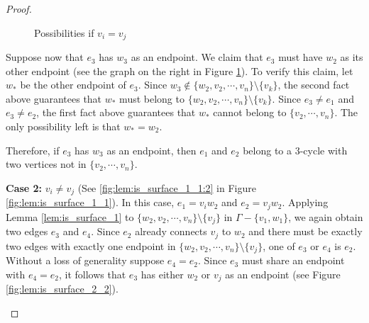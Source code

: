 \begin{proof}
\begin{figure}[h!]
        \quad\quad
        \caption{Possibilities if \(v_i = v_j\)}
        \label{fig:lem:is_surface_2_1}
    \end{figure}

    Suppose now that \(e_3\) has \(w_3\) as an endpoint.
    We claim that \(e_3\) must have \(w_2\) as its other endpoint
    (see the graph on the right in Figure \ref{fig:lem:is_surface_2_1}).
    To verify this claim, let \(w_*\) be the other endpoint of \(e_3\).
    Since \(w_3 \not \in \{w_2, v_2, \cdots, v_n\}\setminus\{v_k\}\),
    the second fact above guarantees that \(w_*\) must belong to \(\{w_2, v_2, \cdots, v_n\}\setminus\{v_k\}\).
    Since \(e_3 \neq e_1\) and \(e_3 \neq e_2\), the first fact above guarantees that \(w_*\)
    cannot belong to \(\{v_2, \cdots, v_n\}\).
    The only possibility left is that \(w_* = w_2\).

    Therefore, if \(e_3\) has \(w_3\) as an endpoint, then \(e_1\) and \(e_2\) belong to a \(3\)-cycle with two vertices
    not in \(\{v_2, \cdots, v_n\}\).

    \textbf{Case 2:} \(v_i \neq v_j\) (See \ref{fig:lem:is_surface_1_1:2} in Figure \ref{fig:lem:is_surface_1_1}).
    In this case, \(e_1 = v_i w_2\) and \(e_2 = v_j w_2\).
    Applying Lemma \ref{lem:is_surface_1} to \(\{w_2, v_2, \cdots, v_n\}\setminus\{v_j\}\) in \(\Gamma - \{v_1, w_1\}\),
    we again obtain two edges \(e_3\) and \(e_4\).
    Since \(e_2\) already connects \(v_j\) to \(w_2\)
    and there must be exactly two edges with exactly one endpoint in \(\{w_2, v_2, \cdots, v_n\}\setminus\{v_j\}\), 
    one of \(e_3\) or \(e_4\) is \(e_2\).
    Without a loss of generality suppose \(e_4 = e_2\).
    Since \(e_3\) must share an endpoint with \(e_4 = e_2\), it follows that \(e_3\)
    has either \(w_2\) or \(v_j\) as an endpoint
    (see Figure \ref{fig:lem:is_surface_2_2}).
    \begin{figure}[h!]
        \centering
\end{figure}
\end{proof}
